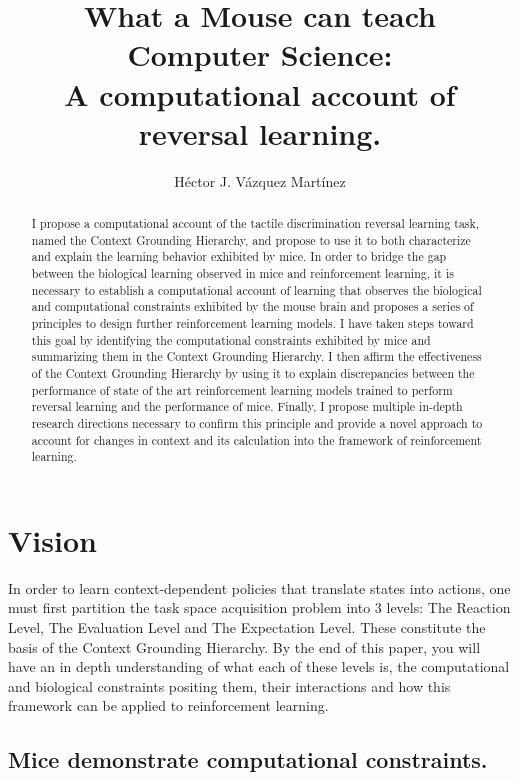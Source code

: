 \documentclass[11pt]{article}
\title{What a Mouse can teach Computer Science: \\
	A computational account of reversal learning.}
\author{H\'ector J. V\'azquez Mart\'inez}
\begin{document}
\maketitle

\begin{abstract}
I propose a computational account of the tactile discrimination reversal learning task, named the Context Grounding Hierarchy, and propose to use it to both characterize and explain the learning behavior exhibited by mice.
In order to bridge the gap between the biological learning observed in mice and reinforcement learning, it is necessary to establish a computational account of learning that observes the biological and computational constraints exhibited by the mouse brain and proposes a series of principles to design further reinforcement learning models.
I have taken steps toward this goal by identifying the computational constraints exhibited by mice and summarizing them in the Context Grounding Hierarchy.  I then affirm the effectiveness of the Context Grounding Hierarchy by using it to explain discrepancies between the performance of state of the art reinforcement learning models trained to perform reversal learning and the performance of mice.  Finally, I propose multiple in-depth research directions necessary to confirm this principle and provide a novel approach to account for changes in context and its  calculation into the framework of reinforcement learning.
\end{abstract}


\section{Vision}
In order to learn context-dependent policies that translate states into actions, one must first partition the task space acquisition problem into 3 levels: The Reaction Level, The Evaluation Level and The Expectation Level.  These constitute the basis of the Context Grounding Hierarchy.  By the end of this paper, you will have an in depth understanding of what each of these levels is, the computational and biological constraints positing them, their interactions and how this framework can be applied to reinforcement learning.

\subsection{Mice demonstrate computational constraints.}
\end{document}
